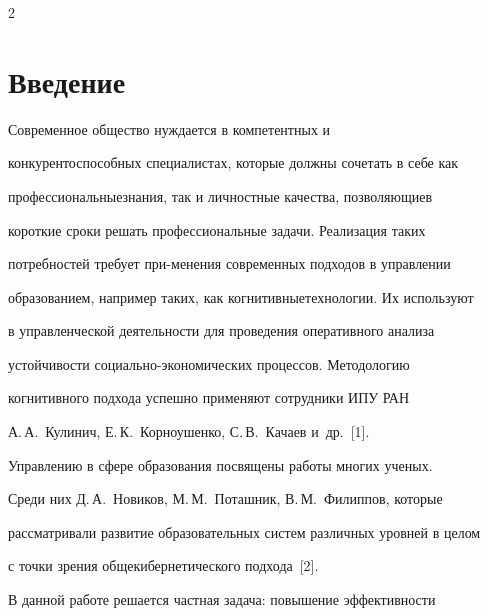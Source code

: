       \begin{multicols}{2}





            \label{st\stat}     


  


  


\section{Введение}





    Современное общество нуждается в компетентных и 


конкурентоспособных специалистах, которые должны сочетать в себе как 


профессиональные\linebreak знания, так и личностные качества, позволяющие\linebreak в 


короткие сроки решать профессиональные задачи. Реализация таких 


потребностей требует при-\linebreak менения современных подходов в управлении 


об\-разованием, например таких, как когнитивные\linebreak технологии. Их используют 


в управленческой деятельности для проведения оперативного анализа 


устой\-чи\-вости со\-ци\-аль\-но-эко\-но\-ми\-че\-ских процессов. Методологию 


когнитивного подхода успешно применяют сотрудники ИПУ РАН 


А.\,А.~Кулинич, Е.\,К.~Корноушенко, С.\,В.~Качаев и~др.~[1]. 


    


    Управлению в сфере образования посвящены работы многих ученых. 


Среди них Д.\,А.~Новиков, М.\,М.~Поташник, В.\,М.~Филиппов, которые 


рассматривали развитие образовательных систем различных уровней в целом 


с точки зрения общекибернетического подхода~[2]. 


    


    В данной работе решается частная задача: повышение эффективности 



\end{multicols}
